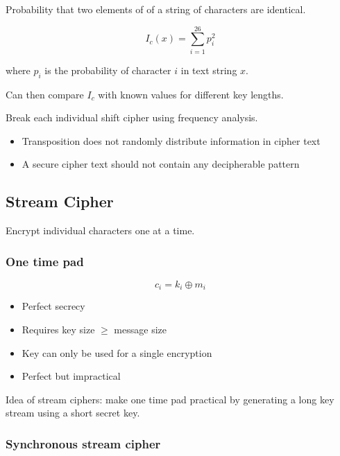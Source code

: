 \documentclass[a4paper]{article}
\begin{document}

Probability that two elements of of a string of characters are identical.

\[
  I_{c}(x) = \sum^{26}_{i = 1}p^{2}_{i}
\]

where $p_{i}$ is the probability of character $i$ in text string $x$.

Can then compare $I_{c}$ with known values for different key lengths.


Break each individual shift cipher using frequency analysis.


\begin{itemize}
  \item Transposition does not randomly distribute information in cipher text
  \item A secure cipher text should not contain any decipherable pattern
\end{itemize}

\subsection{Stream Cipher}

Encrypt individual characters one at a time.

\subsubsection{One time pad}
\label{sec:one_time_pad}

\[
  c_{i} = k_{i} \oplus m_{i}
\]

\begin{itemize}
  \item Perfect secrecy
  \item Requires key size $\geq$ message size
  \item Key can only be used for a single encryption
  \item Perfect but impractical
\end{itemize}

Idea of stream ciphers: make one time pad practical by generating a long key
stream using a short secret key.

\subsubsection{Synchronous stream cipher}
\end{document}

